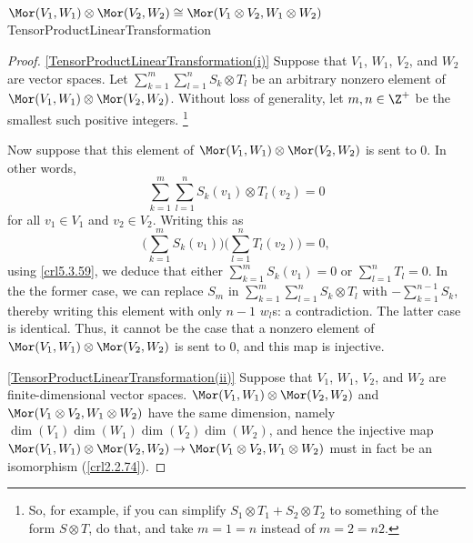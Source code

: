 \begin{thm}{$\Mor (V_1,W_1)\otimes \Mor (V_2,W_2)\cong \Mor (V_1\otimes V_2,W_1\otimes W_2)$}{TensorProductLinearTransformation}
\begin{proof}
		\blni
		\cref{TensorProductLinearTransformation(i)} Suppose that $V_1$, $W_1$, $V_2$, and $W_2$ are vector spaces.  Let $\sum _{k=1}^m\sum _{l=1}^nS_k\otimes T_l$ be an arbitrary nonzero element of $\Mor (V_1,W_1)\otimes \Mor (V_2,W_2)$.  Without loss of generality, let $m,n\in \Z ^+$ be the smallest such positive integers.  \footnote{So, for example, if you can simplify $S_1\otimes T_1+S_2\otimes T_2$ to something of the form $S\otimes T$, do that, and take $m=1=n$ instead of $m=2=n2$.}
		
		Now suppose that this element of $\Mor (V_1,W_1)\otimes \Mor (V_2,W_2)$ is sent to $0$.  In other words,
		\begin{equation}
			\sum _{k=1}^m\sum _{l=1}^nS_k(v_1)\otimes T_l(v_2)=0
		\end{equation}
		for all $v_1\in V_1$ and $v_2\in V_2$.  Writing this as
		\begin{equation}
			\bigg( \sum _{k=1}^mS_k(v_1)\bigg) \bigg( \sum _{l=1}^nT_l(v_2)\bigg) =0,
		\end{equation}
		using \cref{crl5.3.59}, we deduce that either $\sum _{k=1}^mS_k(v_1)=0$ or $\sum _{l=1}^nT_l=0$.  In the the former case, we can replace $S_m$ in $\sum _{k=1}^m\sum _{l=1}^nS_k\otimes T_l$ with $-\sum _{k=1}^{n-1}S_k$, thereby writing this element with only $n-1$ $w_l$s:  a contradiction.  The latter case is identical.  Thus, it cannot be the case that a nonzero element of $\Mor (V_1,W_1)\otimes \Mor (V_2,W_2)$ is sent to $0$, and this map is injective.
		
		\blni
		\cref{TensorProductLinearTransformation(ii)} Suppose that $V_1$, $W_1$, $V_2$, and $W_2$ are finite-dimensional vector spaces.  $\Mor (V_1,W_1)\otimes \Mor (V_2,W_2)$ and $\Mor (V_1\otimes V_2,W_1\otimes W_2)$ have the same dimension, namely $\dim (V_1)\dim (W_1)\dim (V_2)\dim (W_2)$, and hence the injective map $\Mor (V_1,W_1)\otimes \Mor (V_2,W_2)\rightarrow \Mor (V_1\otimes V_2,W_1\otimes W_2)$ must in fact be an isomorphism (\cref{crl2.2.74}).
	\end{proof}
\end{thm}
